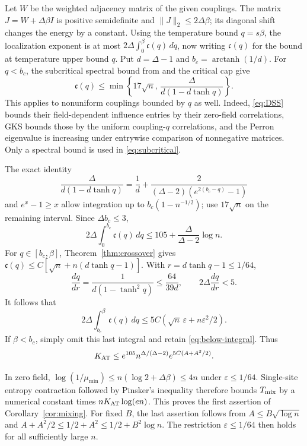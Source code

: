 \documentclass[11pt]{article}
\theoremstyle{remark}
\newcommand{\arctanh}{\operatorname{arctanh}}
\begin{document}
Let $W$ be the weighted adjacency matrix of the given couplings.
The matrix $J=W+\Delta\beta I$ is positive semidefinite and
$\|J\|_2\le2\Delta\beta$; its diagonal shift changes the energy
by a constant. Using the temperature bound $q=s\beta$, the
localization exponent is at most
$2\Delta\int_0^\beta\mathfrak c(q)\,dq$,
now writing $\mathfrak c(q)$ for the bound at temperature upper bound $q$.
Put $d=\Delta-1$ and $b_c=\arctanh(1/d)$.
For $q<b_c$, the subcritical spectral bound from
\cite[Lemma~3.23]{CCYZ} and the critical cap give
\begin{equation}\label{eq:subcritical}
 \mathfrak c(q)\le\min\left\{17\sqrt n,\,
                \frac{\Delta}{d(1-d\tanh q)}\right\}.
\end{equation}
This applies to nonuniform couplings bounded by $q$ as well.
Indeed, \eqref{eq:DSS} bounds their field-dependent influence entries
by their zero-field correlations, GKS bounds those by the uniform
coupling-$q$ correlations, and the Perron eigenvalue is increasing
under entrywise comparison of nonnegative matrices.
Only a spectral bound is used in \eqref{eq:subcritical}.

The exact identity
\[
 \frac{\Delta}{d(1-d\tanh q)}
  =\frac1d+\frac{2}{(\Delta-2)(e^{2(b_c-q)}-1)}
\]
and $e^x-1\ge x$ allow integration up to
$b_c(1-n^{-1/2})$; use $17\sqrt n$ on the remaining interval.
Since $\Delta b_c\le3$,
\begin{equation}\label{eq:below-integral}
 2\Delta\int_0^{b_c}\mathfrak c(q)\,dq
           \le105+\frac{\Delta}{\Delta-2}\log n .
\end{equation}
For $q\in[b_c,\beta]$, Theorem~\ref{thm:crossover} gives
$\mathfrak c(q)\le C[\sqrt n+n(d\tanh q-1)]$.
With $r=d\tanh q-1\le1/64$,
\[
 \frac{dq}{dr}=\frac1{d(1-\tanh^2q)}
       \le\frac{64}{39d},\qquad 2\Delta\frac{dq}{dr}<5.
\]
It follows that
\[
 2\Delta\int_{b_c}^{\beta}\mathfrak c(q)\,dq
       \le5C(\sqrt n\,\varepsilon+n\varepsilon^2/2).
\]
If $\beta<b_c$, simply omit this last integral and retain
\eqref{eq:below-integral}. Thus
\[
 K_{\rm AT}\le e^{105}n^{\Delta/(\Delta-2)}
                         e^{5C(A+A^2/2)}.
\]

In zero field, $\log(1/\mu_{\min})\le n(\log2+\Delta\beta)\le4n$
under $\varepsilon\le1/64$.
Single-site entropy contraction followed by Pinsker's inequality
therefore bounds $T_{\rm mix}$ by a numerical constant times
$nK_{\rm AT}\log(en)$.
This proves the first assertion of Corollary~\ref{cor:mixing}.
For fixed $B$, the last assertion follows from $A\le B\sqrt{\log n}$ and
$A+A^2/2\le1/2+A^2\le1/2+B^2\log n$.
The restriction $\varepsilon\le1/64$ then holds for all sufficiently large $n$.
\end{document}
